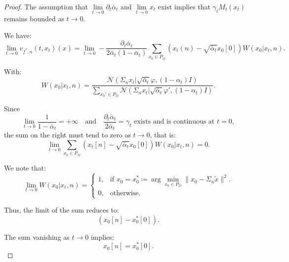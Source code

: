 \documentclass[a4paper,10pt]{article}
\theoremstyle{definition} %
\theoremstyle{definition} %
\theoremstyle{definition} %
\theoremstyle{definition} %
\newcommand{\0}{\boldsymbol{0}}
\begin{document}
\begin{proof}
    The assumption that \( \lim\limits_{t \to 0} \partial_t \bar \alpha_t \) and \( \lim\limits_{t \to 0} x_t \) exist implies that \( \gamma_t M_t(x_t) \) remains bounded as \( t \to 0 \).

    We have:
    \[
        \lim\limits_{t \to 0} v_{f^*,n}(t,x_t) (x) = \lim\limits_{t \to 0} - \frac{\partial_t \bar \alpha_t}{2\bar  \alpha_t (1 - \bar \alpha_t)} \sum_{x_0 \in P_{\Omega}} \left(x_t(n) - \sqrt{\bar{\alpha}_t} x_0[0]\right) W(x_0|x_t,n).
    \]

    With:
    \[
        W(x_0|x_t,n) = \frac{\mathcal{N}(\Sigma_n x_t | \sqrt{\bar{\alpha}_t} \varphi, (1 - \alpha_t)I)}
        {\sum\limits_{x_0' \in P_{\Omega}} \mathcal{N}(\Sigma_n x_t | \sqrt{\bar{\alpha}_t} \varphi', (1 - \alpha_t)I)}.
    \]

    Since 
    \[
        \lim\limits_{t \to 0} \frac{1}{1 - \bar \alpha_t} = +\infty 
        \quad \text{and} \quad 
        \frac{\partial_t \bar \alpha_t}{2 \bar \alpha_t} = \gamma_t \text{ exists and is continuous at } t=0,
    \]
    the sum on the right must tend to zero as \( t \to 0 \), that is:
    \[
        \lim\limits_{t \to 0} \sum_{x_0 \in P_{\Omega}} \left(x_t[n] - \sqrt{\bar{\alpha}_t} x_0[0]\right) W(x_0|x_t,n) = 0.
    \]

    We note that:
    \[
        \lim\limits_{t \to 0} W(x_0|x_t,n) =
        \begin{cases} 
        1, & \text{if } x_0 = x_0^* \coloneqq \arg \min_{x_0 \in P_{\Omega}} \|x_0 - \Sigma_n \tilde{x}\|^2. \\
        0, & \text{otherwise}.
        \end{cases}
    \]

    Thus, the limit of the sum reduces to:
    \[
        (x_0[n] - x_0^*[0]).
    \]

    The sum vanishing as \( t \to 0 \) implies:
    \[
        x_0[n] = x_0^*[0].
    \]
\end{proof}
\end{document}
